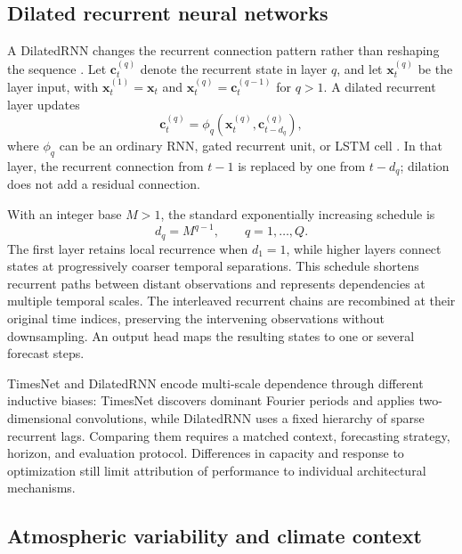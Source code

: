\subsection{Dilated recurrent neural networks}

A DilatedRNN changes the recurrent connection pattern rather than reshaping the
sequence \cite{chang2017}. Let $\mathbf{c}_{t}^{(q)}$ denote the recurrent
state in layer $q$, and let $\mathbf{x}_{t}^{(q)}$ be the layer input, with
$\mathbf{x}_{t}^{(1)}=\mathbf{x}_t$ and
$\mathbf{x}_{t}^{(q)}=\mathbf{c}_{t}^{(q-1)}$ for $q>1$. A dilated recurrent
layer updates
\begin{equation}
  \mathbf{c}_{t}^{(q)}
  =
  \phi_q\!\left(
    \mathbf{x}_{t}^{(q)},
    \mathbf{c}_{t-d_q}^{(q)}
  \right),
  \label{eq:dilated_rnn}
\end{equation}
where $\phi_q$ can be an ordinary RNN, gated recurrent unit, or LSTM cell
\cite{chang2017,hochreiter1997}. In that layer, the recurrent connection from
$t-1$ is replaced by one from $t-d_q$; dilation does not add a residual
connection.

With an integer base $M>1$, the standard exponentially increasing schedule is
\begin{equation}
  d_q=M^{q-1},\qquad q=1,\ldots,Q.
  \label{eq:dilation_schedule}
\end{equation}
The first layer retains local recurrence when $d_1=1$, while higher layers
connect states at progressively coarser temporal separations. This schedule
shortens recurrent paths between distant observations and represents
dependencies at multiple temporal scales. The interleaved recurrent chains
are recombined at their original time indices, preserving the intervening
observations without downsampling. An output head maps the resulting states
to one or several forecast steps.

TimesNet and DilatedRNN encode multi-scale dependence through different
inductive biases: TimesNet discovers dominant Fourier periods and applies
two-dimensional convolutions, while DilatedRNN uses a fixed hierarchy of
sparse recurrent lags. Comparing them requires a matched context,
forecasting strategy, horizon, and evaluation protocol. Differences in
capacity and response to optimization still limit attribution of performance
to individual architectural mechanisms.

\subsection{Atmospheric variability and climate context}


